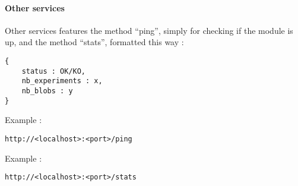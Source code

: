 \paragraph{Other services}
Other services features the method ``ping'', simply for checking if the module is up, and the method ``stats'', formatted this way :
\begin{verbatim}
{
    status : OK/KO,
    nb_experiments : x,
    nb_blobs : y
}
\end{verbatim}
Example :
\begin{verbatim}
http://<localhost>:<port>/ping
\end{verbatim}
Example :
\begin{verbatim}
http://<localhost>:<port>/stats
\end{verbatim}
